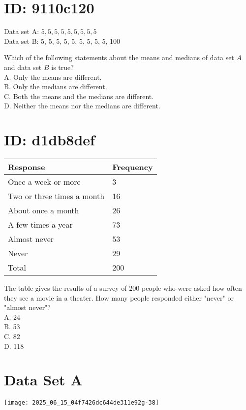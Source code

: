 \section*{ID: 9110c120}
Data set A: $5,5,5,5,5,5,5,5,5$\\
Data set B: 5, 5, 5, 5, 5, 5, 5, 5, 5, 100

Which of the following statements about the means and medians of data set $A$ and data set $B$ is true?\\
A. Only the means are different.\\
B. Only the medians are different.\\
C. Both the means and the medians are different.\\
D. Neither the means nor the medians are different.

\section*{ID: d1db8def}
\begin{center}
\begin{tabular}{|l|l|}
\hline
Response & Frequency \\
\hline
Once a week or more & 3 \\
\hline
Two or three times a month & 16 \\
\hline
About once a month & 26 \\
\hline
A few times a year & 73 \\
\hline
Almost never & 53 \\
\hline
Never & 29 \\
\hline
Total & 200 \\
\hline
\end{tabular}
\end{center}

The table gives the results of a survey of 200 people who were asked how often they see a movie in a theater. How many people responded either "never" or "almost never"?\\
A. 24\\
B. 53\\
C. 82\\
D. 118

\section*{Data Set A}
\begin{center}
\texttt{[image: 2025\_06\_15\_04f7426dc644de311e92g-38]}
\end{center}

